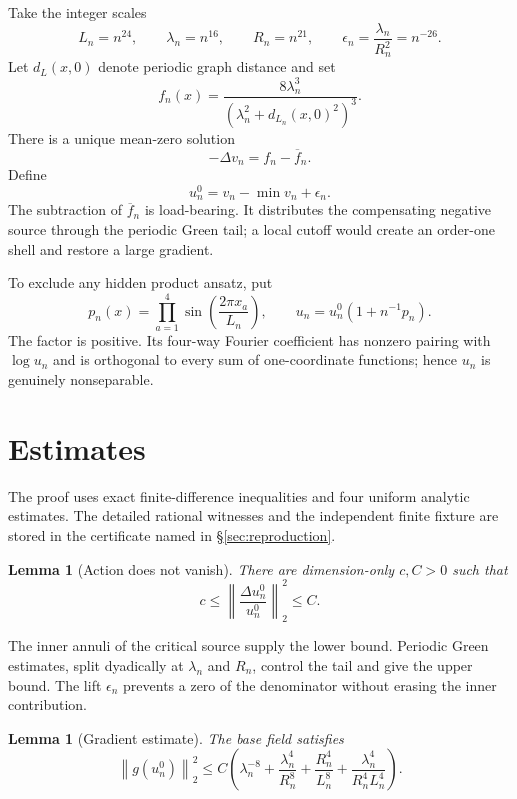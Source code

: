 \documentclass[11pt]{article}
\newtheorem{lemma}[theorem]{Lemma}
\theoremstyle{remark}
\newcommand{\norm}[1]{\left\lVert#1\right\rVert}
\begin{document}
Take the integer scales
\[
 L_n=n^{24},\qquad \lambda_n=n^{16},\qquad R_n=n^{21},
 \qquad \epsilon_n=\frac{\lambda_n}{R_n^2}=n^{-26}.
\]
Let \(d_L(x,0)\) denote periodic graph distance and set
\begin{equation}
 f_n(x)=\frac{8\lambda_n^3}
   {(\lambda_n^2+d_{L_n}(x,0)^2)^3}.
 \label{eq:source}
\end{equation}
There is a unique mean-zero solution
\begin{equation}
 -\Delta v_n=f_n-\overline f_n.
 \label{eq:green}
\end{equation}
Define
\[
 u_n^0=v_n-\min v_n+\epsilon_n.
\]
The subtraction of \(\overline f_n\) is load-bearing.  It distributes the
compensating negative source through the periodic Green tail; a local cutoff
would create an order-one shell and restore a large gradient.

To exclude any hidden product ansatz, put
\[
 p_n(x)=\prod_{a=1}^4\sin\!\left(\frac{2\pi x_a}{L_n}\right),
 \qquad u_n=u_n^0(1+n^{-1}p_n).
\]
The factor is positive.  Its four-way Fourier coefficient has nonzero pairing
with \(\log u_n\) and is orthogonal to every sum of one-coordinate functions;
hence \(u_n\) is genuinely nonseparable.

\section{Estimates}

The proof uses exact finite-difference inequalities and four uniform analytic
estimates.  The detailed rational witnesses and the independent finite
fixture are stored in the certificate named in
\S\ref{sec:reproduction}.

\begin{lemma}[Action does not vanish]
There are dimension-only \(c,C>0\) such that
\[
 c\leq\left\|\frac{\Delta u_n^0}{u_n^0}\right\|_2^2\leq C.
\]
\end{lemma}

The inner annuli of the critical source supply the lower bound.  Periodic
Green estimates, split dyadically at \(\lambda_n\) and \(R_n\), control the
tail and give the upper bound.  The lift \(\epsilon_n\) prevents a zero of
the denominator without erasing the inner contribution.

\begin{lemma}[Gradient estimate]
The base field satisfies
\[
 \norm{g(u_n^0)}_2^2\leq C\left(
 \lambda_n^{-8}+\frac{\lambda_n^4}{R_n^8}
 +\frac{R_n^4}{L_n^8}
 +\frac{\lambda_n^4}{R_n^4L_n^4}\right).
\]
\end{lemma}
\end{document}
